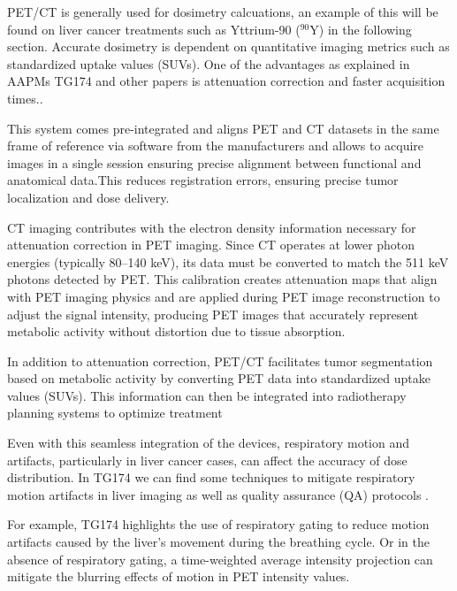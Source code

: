\documentclass[11pt]{article} %
\begin{document}
\begin{multicols}{2}
PET/CT is generally used for dosimetry calcuations, an example of this will be found on liver cancer treatments such as Yttrium-90 (\(^{90}\text{Y}\)) in the following section. Accurate dosimetry is dependent on quantitative imaging metrics such as standardized uptake values (SUVs). One of the advantages as explained in AAPMs TG174 and other papers is attenuation correction and faster acquisition times.\cite{knesaurek2018,TG174}. 

This system comes pre-integrated and aligns PET and CT datasets in the same frame of reference via software from the manufacturers and allows to acquire images in a single session ensuring precise alignment between functional and anatomical data.This reduces registration errors, ensuring precise tumor localization and dose delivery. 

CT imaging contributes with the electron density information necessary for attenuation correction in PET imaging. Since CT operates at lower photon energies (typically 80–140 keV), its data must be converted to match the 511 keV photons detected by PET. This calibration creates attenuation maps that align with PET imaging physics and are applied during PET image reconstruction to adjust the signal intensity, producing PET images that accurately represent metabolic activity without distortion due to tissue absorption.\cite{knesaurek2018, TG174}

In addition to attenuation correction, PET/CT facilitates tumor segmentation based on metabolic activity by converting PET data into standardized uptake values (SUVs). This information can then be integrated into radiotherapy planning systems to optimize treatment

Even with this seamless integration of the devices, respiratory motion and artifacts, particularly in liver cancer cases, can affect the accuracy of dose distribution. In TG174 we can find some techniques to mitigate respiratory motion artifacts in liver imaging as well as quality assurance (QA) protocols \cite{TG174}.

For example, TG174 highlights the use of respiratory gating to reduce motion artifacts caused by the liver’s movement during the breathing cycle. Or in the absence of respiratory gating, a time-weighted average intensity projection can mitigate the blurring effects of motion in PET intensity values.


\end{multicols}
\end{document}
